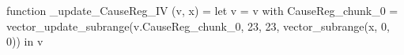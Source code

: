 function _update_CauseReg_IV (v, x) = let v = { v with CauseReg_chunk_0 = vector_update_subrange(v.CauseReg_chunk_0, 23, 23, vector_subrange(x, 0, 0)) } in v

